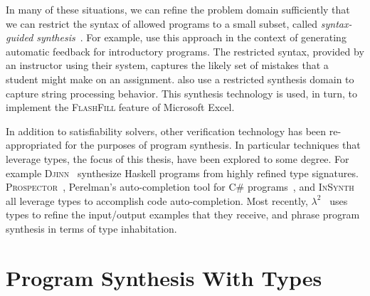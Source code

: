 In many of these situations, we can refine the problem domain sufficiently that we can restrict the syntax of allowed programs to a small subset, called \emph{syntax-guided synthesis}~\citet{alur-fmcad-2013}.
For example, \citet{singh-pldi-2013} use this approach in the context of generating automatic feedback for introductory programs.
The restricted syntax, provided by an instructor using their system, captures the likely set of mistakes that a student might make on an assignment.
\citet{gulwani-popl-2011} also use a restricted synthesis domain to capture string processing behavior.
This synthesis technology is used, in turn, to implement the \textsc{FlashFill} feature of Microsoft Excel.

In addition to satisfiability solvers, other verification technology has been re-appropriated for the purposes of program synthesis.
In particular techniques that leverage types, the focus of this thesis, have been explored to some degree.
For example \textsc{Djinn}~\citep{augustsson-2004} synthesize Haskell programs from highly refined type signatures.
\textsc{Prospector}~\citep{mandelin-pldi-2005}, Perelman's auto-completion tool for C\# programs~\citep{perelman-pldi-2012}, and \textsc{InSynth}~\citep{gvero-pldi-2013} all leverage types to accomplish code auto-completion.
Most recently, $λ^2$~\citep{feser-pldi-2015} uses types to refine the input/output examples that they receive, and \citet{scherer-icfp-2015} phrase program synthesis in terms of type inhabitation.

\section{Program Synthesis With Types}

